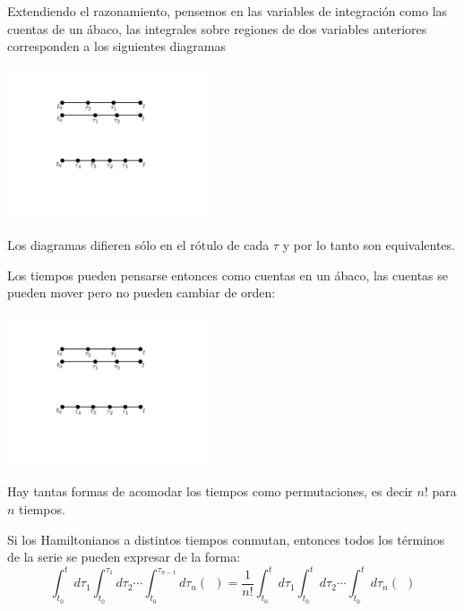 \documentclass{beamer}
\begin{document}
    \begin{frame}

    
    Extendiendo el razonamiento, pensemos en las variables de integración como las cuentas de un ábaco, las integrales sobre regiones de dos variables anteriores corresponden a los siguientes diagramas
    \begin{center}
        \includegraphics[width=6cm]{figs/beads1.pdf} 
    \end{center}
    Los diagramas difieren sólo en el rótulo de cada $\tau$ y por lo tanto son equivalentes.
    \end{frame}
 

\begin{frame}
    Los tiempos pueden pensarse entonces como cuentas en un ábaco, las cuentas se pueden mover pero no pueden cambiar de orden:

    \begin{center}
        \includegraphics[width=6cm]{figs/beads2.pdf} 
    \end{center}

    Hay tantas formas de acomodar los tiempos como permutaciones, es decir $n!$ para $n$ tiempos.

    Si los Hamiltonianos a distintos tiempos conmutan, entonces todos los términos de la serie se pueden expresar de la forma:
    \begin{equation*}
        \int_{t_0}^t d\tau_1\int_{t_0}^{\tau_1} d\tau_2 \cdots \int_{t_0}^{\tau_{n-1}} d\tau_n(\ \ )=
        \frac{1}{n!}\int_{t_0}^t d\tau_1\int_{t_0}^t d\tau_2 \cdots\int_{t_0}^t d\tau_n(\ \ )
    \end{equation*}
    
\end{frame}
\end{document}
